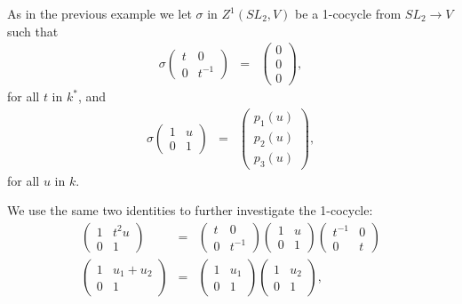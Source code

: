 As in the previous example we let $\sigma$ in $Z^1(SL_2, V)$ be a 1-cocycle from $SL_2\rightarrow V$ such that
\begin{eqnarray*}
\sigma\left( \begin{matrix} t & 0 \\ 0 & t^{-1}\end{matrix}\right) &=& 
\left( \begin{matrix} 0 \\ 0 \\0\end{matrix}\right),
\end{eqnarray*}
for all $t$ in $k^*$, and
\begin{eqnarray*}
\sigma\left(\begin{matrix} 1& u \\ 0 & 1\end{matrix}\right) &=&
\left(\begin{matrix} p_1(u) \\ p_2(u) \\ p_3(u) \end{matrix}\right),
\end{eqnarray*}
for all $u$ in $k$.

We use the same two identities to further investigate the 1-cocycle:
\begin{eqnarray}
\label{eq:no1}
\left(\begin{matrix} 1 & t^2u \\ 0 & 1\end{matrix}\right) &=&
\left(\begin{matrix} t & 0 \\ 0 & t^{-1}  \end{matrix}\right) 
\left(\begin{matrix} 1 & u \\ 0 & 1 \end{matrix}\right) 
\left(\begin{matrix}  t^{-1} & 0 \\ 0 & t \end{matrix}\right) \\
\label{eq:no2}
\left(\begin{matrix} 1 & u_1 + u_2 \\ 0 & 1 \end{matrix}\right) &=&
\left(\begin{matrix} 1 & u_1 \\ 0 & 1 \end{matrix}\right) 
\left(\begin{matrix} 1 & u_2 \\ 0 & 1 \end{matrix}\right),
\end{eqnarray}

